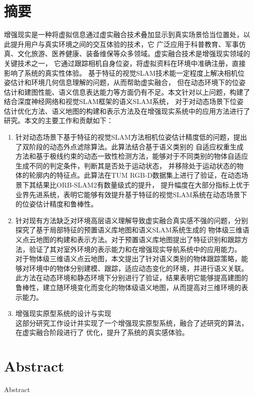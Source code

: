 \maketitle%
\MAKETITLE%
\makedeclaration%
\intobmk\chapter*{摘\quad 要}%
\setcounter{page}{1}%

增强现实是一种将虚拟信息通过虚实融合技术叠加显示到真实场景恰当位置处，以此提升用户与真实环境之间的交互体验的技术，它
广泛应用于科普教育、军事仿真、文化旅游、医养健康、装备维保等众多领域。虚实融合技术是增强现实领域的关键技术之一，
它通过跟踪相机自身位姿，将虚拟资料在环境中准确注册，直接影响了系统的真实性体验。
基于特征的视觉SLAM技术能一定程度上解决相机位姿估计和环境几何信息理解的问题，从而帮助虚实融合，
但在动态环境下的位姿估计和建图性能、语义信息表达能力等方面仍有不足。本文针对以上问题，构建了结合深度神经网络和视觉SLAM框架的语义SLAM系统，
对于对动态场景下位姿估计优化方法、语义地图的构建和表示方法及在增强现实系统中的应用方法进行了研究。本文的主要工作和贡献如下：
{
\setlist[enumerate]{}%
\begin{enumerate}[nosep]
    \item 针对动态场景下基于特征的视觉SLAM方法相机位姿估计精度低的问题，提出了双阶段的动态外点滤除算法。此算法结合基于语义类别的
    自适应权重生成方法和基于极线约束的动态一致性检测方法，能够对于不同类别的物体自适应生成不同的判定条件，判断其是否处于运动状态，
    并移除处于运动状态的物体的轮廓内的特征点。此算法在TUM RGB-D数据集上进行了验证，在动态场景下其结果比ORB-SLAM2有数量级式的提升，
    提升幅度在大部分指标上优于业界先进系统，表明它能够有效提升基于特征的视觉SLAM系统在动态场景下的位姿估计精度和鲁棒性。
    \item 针对现有方法缺乏对环境高层语义理解导致虚实融合真实感不强的问题，分别探究了基于局部特征的预置语义库地图和语义SLAM系统生成的
    物体级三维语义点云地图的构建和表示方法。对于预置语义库地图提出了特征识别和跟踪方法，验证了其对室外环境的表示能力和在增强现实导航系统中的应用能力。
    对于物体级三维语义点云地图，本文提出了针对语义类别的物体跟踪策略，能够对环境中的物体分别建模、跟踪，适应动态变化的环境，并进行语义关联。
    此方法在动态环境和静态环境下分别进行了验证，结果表明它能够提高建图的鲁棒性，建立随环境变化而变化的物体级语义地图，从而提高对三维环境的表示能力。
    \item 增强现实原型系统的设计与实现\\这部分研究工作设计并实现了一个增强现实原型系统，融合了述研究的算法，在虚实融合阶段进行了
    优化，提升了系统的真实感体验。
\end{enumerate}
}

\intobmk\chapter*{Abstract}%

Abstract

